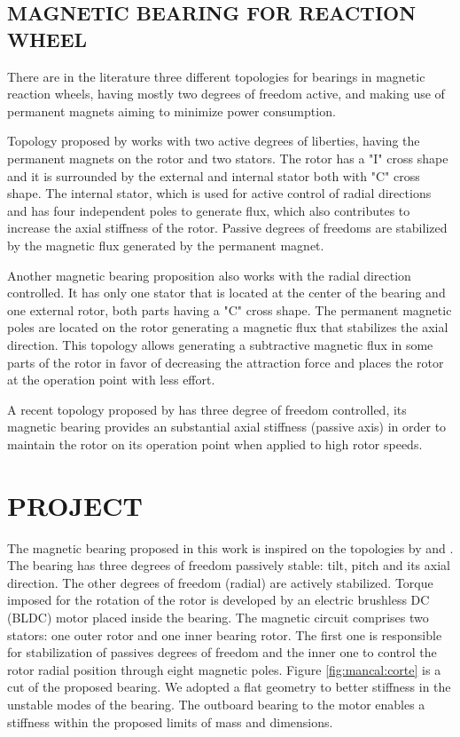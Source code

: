 \documentclass[10pt,fleqn,a4paper,twoside]{article}
\begin{document}
	\subsection{\uppercase{Magnetic Bearing for Reaction Wheel}}
	
	There are in the literature three different topologies for bearings in magnetic reaction wheels, having mostly two degrees of freedom active, and making use of permanent magnets aiming to minimize power consumption.
	
	Topology proposed by \cite{Bernus1998} works with two active degrees of liberties, having the permanent magnets on the rotor and two stators. The rotor has a "I" cross shape and it is surrounded by the external and internal stator  both with "C" cross shape. The internal stator, which is used for active control of radial directions and has four independent poles to generate flux, which also contributes to increase the axial stiffness of the rotor. Passive degrees of freedoms are stabilized by the magnetic flux generated by the permanent magnet.
	
	Another magnetic bearing proposition \citep{Scharfe2001} also works with the radial direction controlled. It has only one stator that is located at the center of the bearing and one external rotor, both parts having a "C" cross shape. The permanent magnetic poles are located on the rotor generating a magnetic flux that stabilizes the axial direction. This topology allows generating a subtractive magnetic flux in some parts of the rotor in favor of decreasing the attraction force and places the rotor at the operation point with less effort. 
	
	A recent topology proposed by \cite{Bangcheng2012} has  three degree of freedom controlled, its magnetic bearing  provides an substantial axial stiffness (passive axis) in order to maintain the rotor on its operation point when applied to high rotor speeds.
		
	\section{\uppercase{Project}}
	
	The magnetic bearing proposed in this work is inspired on the topologies by \cite{Bernus1998} and \cite{Scharfe2001}. The bearing has three degrees of freedom passively stable: tilt, pitch and its axial direction. The other degrees of freedom (radial) are actively stabilized. Torque imposed for the rotation of the rotor is developed by an electric brushless DC (BLDC) motor placed inside the bearing. The magnetic circuit comprises two stators: one outer rotor and one inner bearing rotor. The first one is responsible for stabilization of passives degrees of freedom and the inner one to control the rotor radial position through eight magnetic poles.%
	 Figure \ref{fig:mancal:corte} is a cut of the proposed bearing. We adopted a flat geometry to better stiffness in the unstable modes of the bearing. The outboard bearing to the motor enables a stiffness within the proposed limits of mass and dimensions.
	
\end{document}
